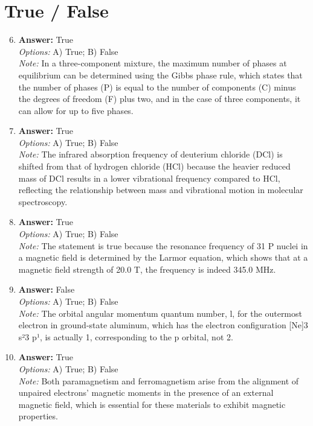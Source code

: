 \documentclass[12pt]{article}
\begin{document}
\section*{True / False}
\begin{enumerate}[label=\arabic*.]
\setcounter{enumi}{5}
\item \textbf{Answer:} True
\\ \textit{Options:} A) True; B) False
\\ \textit{Note:} In a three-component mixture, the maximum number of phases at equilibrium can be determined using the Gibbs phase rule, which states that the number of phases (P) is equal to the number of components (C) minus the degrees of freedom (F) plus two, and in the case of three components, it can allow for up to five phases.
\item \textbf{Answer:} True
\\ \textit{Options:} A) True; B) False
\\ \textit{Note:} The infrared absorption frequency of deuterium chloride (DCl) is shifted from that of hydrogen chloride (HCl) because the heavier reduced mass of DCl results in a lower vibrational frequency compared to HCl, reflecting the relationship between mass and vibrational motion in molecular spectroscopy.
\item \textbf{Answer:} True
\\ \textit{Options:} A) True; B) False
\\ \textit{Note:} The statement is true because the resonance frequency of 31 P nuclei in a magnetic field is determined by the Larmor equation, which shows that at a magnetic field strength of 20.0 T, the frequency is indeed 345.0 MHz.
\item \textbf{Answer:} False
\\ \textit{Options:} A) True; B) False
\\ \textit{Note:} The orbital angular momentum quantum number, l, for the outermost electron in ground-state aluminum, which has the electron configuration [Ne]3 s²3 p¹, is actually 1, corresponding to the p orbital, not 2.
\item \textbf{Answer:} True
\\ \textit{Options:} A) True; B) False
\\ \textit{Note:} Both paramagnetism and ferromagnetism arise from the alignment of unpaired electrons' magnetic moments in the presence of an external magnetic field, which is essential for these materials to exhibit magnetic properties.
\end{enumerate}
\end{document}
